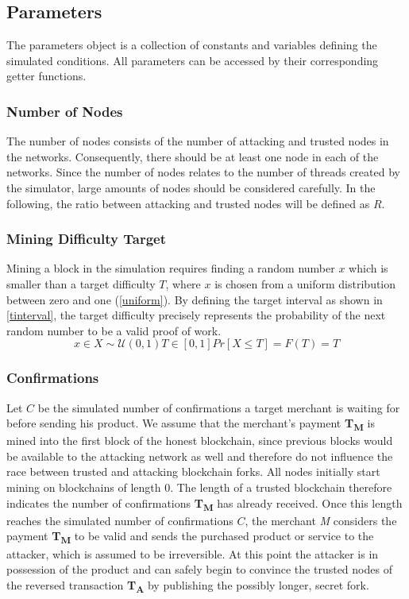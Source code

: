 \documentclass[a4paper,12pt,twoside]{report}
\begin{document}
\subsection{Parameters} \label{params}
The parameters object is a collection of constants and variables defining the simulated conditions. All parameters can be accessed by their corresponding getter functions.
\subsubsection{Number of Nodes}
The number of nodes consists of the number of attacking and trusted nodes in the networks. Consequently, there should be at least one node in each of the networks. Since the number of nodes relates to the number of threads created by the simulator, large amounts of nodes should be considered carefully. In the following, the ratio between attacking and trusted nodes will be defined as $R$.
\subsubsection{Mining Difficulty Target}
Mining a block in the simulation requires finding a random number $x$ which is smaller than a target difficulty $T$, where $x$ is chosen from a uniform distribution between zero and one (\autoref{uniform}). By defining the target interval as shown in \autoref{tinterval}, the target difficulty precisely represents the probability of the next random number to be a valid proof of work.
\begin{subequations}
\begin{equation}\label{uniform}
x \in X\sim \mathcal{U}(0,1)
\end{equation}
\begin{equation}\label{tinterval}
T \in [0,1]
\end{equation}
\begin{equation}\label{probability}
Pr[X \leq T] = F(T) = T
\end{equation}
\end{subequations}
\subsubsection{Confirmations}
Let $C$ be the simulated number of confirmations a target merchant is waiting for before sending his product. We assume that the merchant's payment \textbf{T\textsubscript{M}} is mined into the first block of the honest blockchain, since previous blocks would be available to the attacking network as well and therefore do not influence the race between trusted and attacking blockchain forks. All nodes initially start mining on blockchains of length 0. The length of a trusted blockchain therefore indicates the number of confirmations \textbf{T\textsubscript{M}} has already received. Once this length reaches the simulated number of confirmations $C$, the merchant \textit{M} considers the payment \textbf{T\textsubscript{M}} to be valid and sends the purchased product or service to the attacker, which is assumed to be irreversible. At this point the attacker is in possession of the product and can safely begin to convince the trusted nodes of the reversed transaction \textbf{T\textsubscript{A}} by publishing the possibly longer, secret fork.
\end{document}
